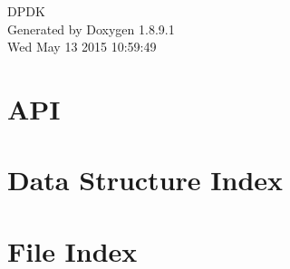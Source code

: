 \documentclass[twoside]{book}
\newcommand{\+}{\discretionary{\mbox{\scriptsize$\hookleftarrow$}}{}{}}
\newcommand{\clearemptydoublepage}{%
  \newpage{\pagestyle{empty}\cleardoublepage}%
}
\begin{document}
\hypersetup{pageanchor=false,
             bookmarks=true,
             bookmarksnumbered=true,
             pdfencoding=unicode
            }
\begin{titlepage}
\vspace*{7cm}
\begin{center}%
{\Large D\+P\+D\+K }\\
\vspace*{1cm}
{\large Generated by Doxygen 1.8.9.1}\\
\vspace*{0.5cm}
{\small Wed May 13 2015 10:59:49}\\
\end{center}
\end{titlepage}
\clearemptydoublepage
\tableofcontents
\clearemptydoublepage
{}
\hypersetup{pageanchor=true}

\chapter{A\+P\+I}
\label{index}\hypertarget{index}{}
\chapter{Data Structure Index}

\chapter{File Index}

\end{document}
